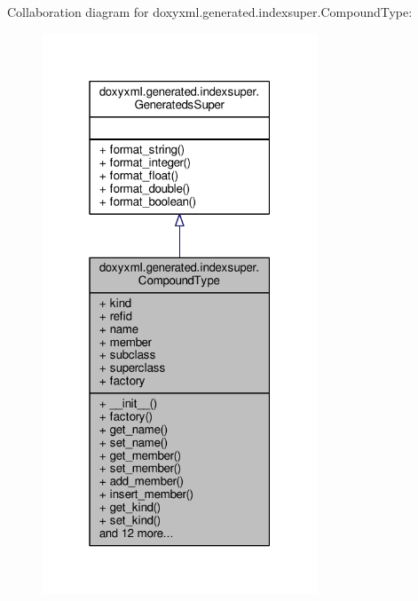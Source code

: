 Collaboration diagram for doxyxml.\+generated.\+indexsuper.\+Compound\+Type\+:
\nopagebreak
\begin{figure}[H]
\begin{center}
\leavevmode
\includegraphics[width=232pt]{dd/db4/classdoxyxml_1_1generated_1_1indexsuper_1_1CompoundType__coll__graph}
\end{center}
\end{figure}

